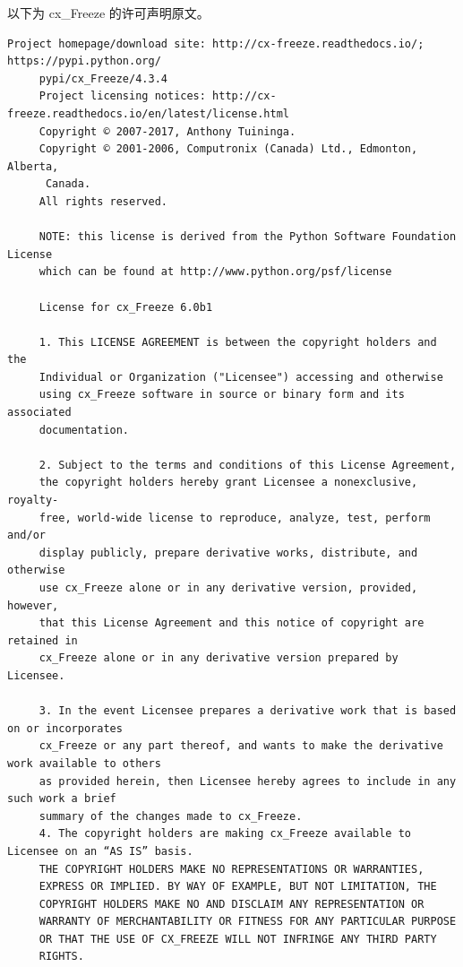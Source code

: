 以下为 cx\_Freeze 的许可声明原文。

\begin{lstlisting}[basicstyle=\ttfamily\footnotesize,breaklines=true]
     Project homepage/download site: http://cx-freeze.readthedocs.io/; https://pypi.python.org/
     pypi/cx_Freeze/4.3.4
     Project licensing notices: http://cx-freeze.readthedocs.io/en/latest/license.html
     Copyright © 2007-2017, Anthony Tuininga.
     Copyright © 2001-2006, Computronix (Canada) Ltd., Edmonton, Alberta,
      Canada.
     All rights reserved.

     NOTE: this license is derived from the Python Software Foundation License
     which can be found at http://www.python.org/psf/license

     License for cx_Freeze 6.0b1

     1. This LICENSE AGREEMENT is between the copyright holders and the
     Individual or Organization ("Licensee") accessing and otherwise
     using cx_Freeze software in source or binary form and its associated
     documentation.

     2. Subject to the terms and conditions of this License Agreement,
     the copyright holders hereby grant Licensee a nonexclusive, royalty-
     free, world-wide license to reproduce, analyze, test, perform and/or
     display publicly, prepare derivative works, distribute, and otherwise
     use cx_Freeze alone or in any derivative version, provided, however,
     that this License Agreement and this notice of copyright are retained in
     cx_Freeze alone or in any derivative version prepared by Licensee.

     3. In the event Licensee prepares a derivative work that is based on or incorporates
     cx_Freeze or any part thereof, and wants to make the derivative work available to others
     as provided herein, then Licensee hereby agrees to include in any such work a brief
     summary of the changes made to cx_Freeze.
     4. The copyright holders are making cx_Freeze available to Licensee on an “AS IS” basis.
     THE COPYRIGHT HOLDERS MAKE NO REPRESENTATIONS OR WARRANTIES,
     EXPRESS OR IMPLIED. BY WAY OF EXAMPLE, BUT NOT LIMITATION, THE
     COPYRIGHT HOLDERS MAKE NO AND DISCLAIM ANY REPRESENTATION OR
     WARRANTY OF MERCHANTABILITY OR FITNESS FOR ANY PARTICULAR PURPOSE
     OR THAT THE USE OF CX_FREEZE WILL NOT INFRINGE ANY THIRD PARTY
     RIGHTS.





\end{lstlisting}
